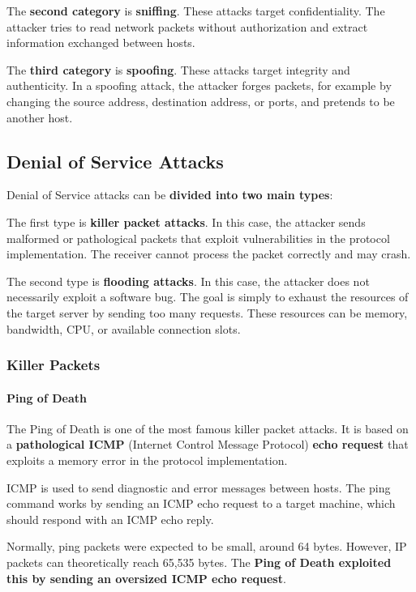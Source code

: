 \documentclass{article}
\begin{document}
The \textbf{second category} is \textbf{sniffing}. These attacks target confidentiality. The attacker tries to read network packets without authorization and extract information exchanged between hosts.

The \textbf{third category} is \textbf{spoofing}. These attacks target integrity and authenticity. In a spoofing attack, the attacker forges packets, for example by changing the source address, destination address, or ports, and pretends to be another host.

\subsection{Denial of Service Attacks}

Denial of Service attacks can be \textbf{divided into two main types}:

The first type is \textbf{killer packet attacks}. In this case, the attacker sends malformed or pathological packets that exploit vulnerabilities in the protocol implementation. The receiver cannot process the packet correctly and may crash.

The second type is \textbf{flooding attacks}. In this case, the attacker does not necessarily exploit a software bug. The goal is simply to exhaust the resources of the target server by sending too many requests. These resources can be memory, bandwidth, CPU, or available connection slots.

\subsubsection{Killer Packets}

\paragraph{Ping of Death}

The Ping of Death is one of the most famous killer packet attacks. It is based on a \textbf{pathological ICMP} (Internet Control Message Protocol) \textbf{echo request} that exploits a memory error in the protocol implementation.

ICMP is used to send diagnostic and error messages between hosts. The ping command works by sending an ICMP echo request to a target machine, which should respond with an ICMP echo reply.

Normally, ping packets were expected to be small, around 64 bytes. However, IP packets can theoretically reach 65,535 bytes. The \textbf{Ping of Death exploited this by sending an oversized ICMP echo request}.
\end{document}
